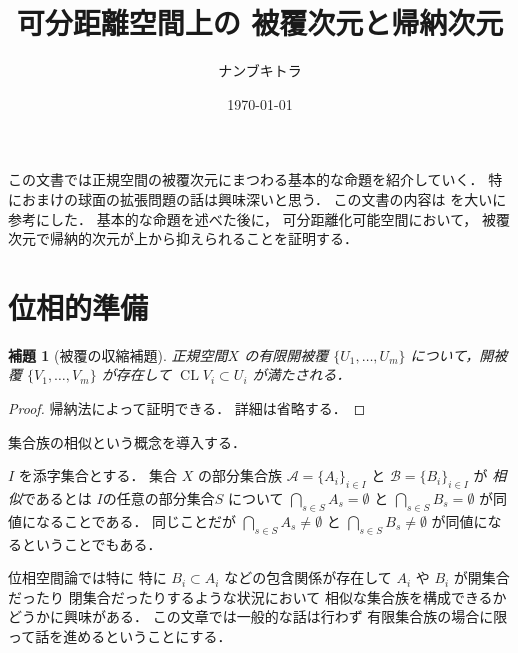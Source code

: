 \documentclass[leqno, a4paper, 12pt]{jsarticle}
\title{
可分距離空間上の
被覆次元と帰納次元
}
\author{ナンブキトラ}
\date{\today}
\newtheorem{lem}[thm]{補題}
\DeclareMathOperator{\cl}{CL}
\newcommand{\yoemph}[1]{\emph{#1}}
\numberwithin{equation}{section}
\begin{document}
\maketitle

\tableofcontents

この文書では正規空間の被覆次元にまつわる基本的な命題を紹介していく．
特におまけの球面の拡張問題の話は興味深いと思う．
この文書の内容は
\cite{Morita}
を大いに参考にした．
基本的な命題を述べた後に，
可分距離化可能空間において，
被覆次元で帰納的次元が上から抑えられることを証明する．

\section{位相的準備}


\begin{lem}[被覆の収縮補題]\label{lem:shrink}
正規空間$X$
の有限開被覆
$\{U_{1}, \dots, U_{m}\}$
について，開被覆
$\{V_{1}, \dots, V_{m}\}$
が存在して
$\cl V_{i}\subset U_{i}$
が満たされる．
\end{lem}
\begin{proof}
帰納法によって証明できる．
詳細は省略する．
\end{proof}


集合族の相似という概念を導入する．

$I$
を添字集合とする．
集合
$X$
の部分集合族
$\mathcal{A}=\{A_{i}\}_{i\in I}$
と
$\mathcal{B}=\{B_{i}\}_{i\in I}$
が
\yoemph{相似}であるとは
$I$の任意の部分集合$S$
について
$\bigcap_{s\in S}A_{s}=\emptyset$
と
$\bigcap_{s\in S}B_{s}=\emptyset$
が同値になることである．
同じことだが
$\bigcap_{s\in S}A_{s}\neq \emptyset$
と
$\bigcap_{s\in S}B_{s}\neq\emptyset$
が同値になるということでもある．

位相空間論では特に
特に
$B_{i}\subset A_{i}$
などの包含関係が存在して
$A_{i}$
や
$B_{i}$
が開集合だったり
閉集合だったりするような状況において
相似な集合族を構成できるかどうかに興味がある．
この文章では一般的な話は行わず
有限集合族の場合に限って話を進めるということにする．
\end{document}
